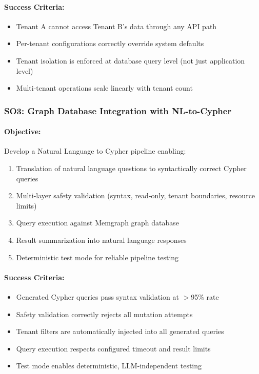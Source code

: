 \documentclass[a4paper,twoside]{sapthesis}
\begin{document}
\paragraph{Success Criteria:}
\begin{itemize}
    \item Tenant A cannot access Tenant B's data through any API path
    \item Per-tenant configurations correctly override system defaults
    \item Tenant isolation is enforced at database query level (not just application level)
    \item Multi-tenant operations scale linearly with tenant count
\end{itemize}

\subsubsection{SO3: Graph Database Integration with NL-to-Cypher}

\paragraph{Objective:} Develop a Natural Language to Cypher pipeline enabling:

\begin{enumerate}
    \item Translation of natural language questions to syntactically correct Cypher queries
    \item Multi-layer safety validation (syntax, read-only, tenant boundaries, resource limits)
    \item Query execution against Memgraph graph database
    \item Result summarization into natural language responses
    \item Deterministic test mode for reliable pipeline testing
\end{enumerate}

\paragraph{Success Criteria:}
\begin{itemize}
    \item Generated Cypher queries pass syntax validation at $>$95\% rate
    \item Safety validation correctly rejects all mutation attempts
    \item Tenant filters are automatically injected into all generated queries
    \item Query execution respects configured timeout and result limits
    \item Test mode enables deterministic, LLM-independent testing
\end{itemize}
\end{document}

